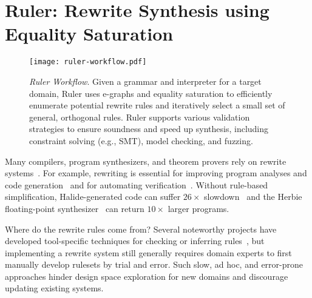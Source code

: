 \section{Ruler: Rewrite Synthesis using Equality Saturation}
\label{sec:ruler}

\newcommand{\rationals}{{rationals}\xspace}
\newcommand{\bfour}{{bitvector-4}\xspace}
\newcommand{\bthreetwo}{{bitvector-32}\xspace}
\newcommand{\booleans}{{booleans}\xspace}
\newcommand{\ints}{ℤ}
\newcommand{\reals}{ℝ}
\newcommand{\ruler}{Ruler\xspace}
\newcommand{\Ruler}{Ruler\xspace}
\newcommand{\cvec}{cvec\xspace}
\newcommand{\cvecs}{cvecs\xspace}



\begin{figure}
  \texttt{[image: ruler-workflow.pdf]}
  \caption{
    \textit{\ruler Workflow}.
    Given a grammar and interpreter for a target domain,
    \ruler uses e-graphs and equality saturation
    to efficiently enumerate potential rewrite rules and
    iteratively select a small set of general, orthogonal rules.
    \ruler supports various validation strategies to
    ensure soundness and speed up synthesis, including
    constraint solving (e.g., SMT), model checking, and fuzzing.
  }\label{fig:ruler}
\end{figure}

Many compilers, program synthesizers, and theorem provers
  rely on rewrite systems~\cite{
    haskell, arvind-hw-synth-rw, simplify}.
For example, rewriting is essential for
  improving program analyses and code generation~\cite{
    isel-survey, mlir, halide, tvm}
  and for automating verification~\cite{
    cvc4, z3, isabelle, coq}.
Without rule-based simplification,
  Halide-generated code can
  suffer $26\times$ slowdown~\cite{julie-halide}
  and
  the Herbie floating-point synthesizer~\cite{herbie}
  can return $10\times$ larger programs.

Where do the rewrite rules come from?
Several noteworthy projects have developed
  tool-specific techniques for checking or inferring rules~\cite{
    bansal, alive-infer, denali, swapper},
  but %
  implementing a rewrite system
  still generally requires domain experts to
  first manually develop rulesets by trial and error.
Such slow, ad hoc, and error-prone approaches
  hinder design space exploration for new domains
  and discourage updating existing systems.


